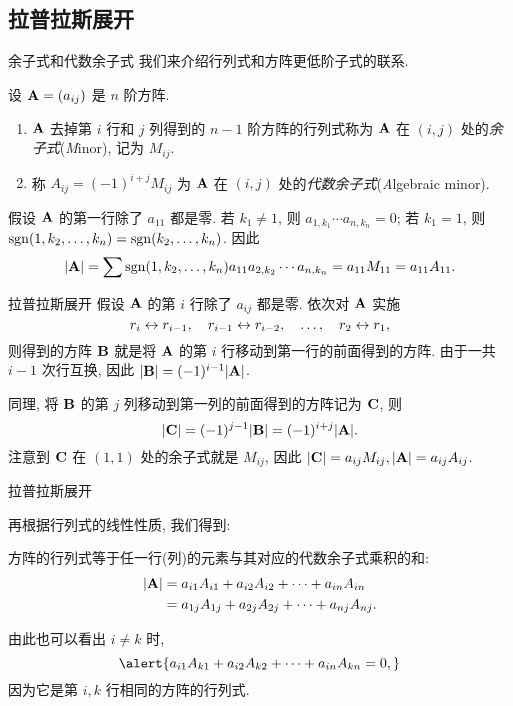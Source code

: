 \subsection{拉普拉斯展开}

\begin{frame}{余子式和代数余子式}
	\onslide<+->
	我们来介绍行列式和方阵更低阶子式的联系.
	\onslide<+->
	\begin{definition}
		设 ${\mathbf{A}}=(a_{ij})$ 是 $n$ 阶方阵.
		\begin{enumerate}
			\item ${\mathbf{A}}$ 去掉第 $i$ 行和 $j$ 列得到的 $n-1$ 阶方阵的行列式称为 ${\mathbf{A}}$ 在 $(i,j)$ 处的\emph{余子式}(\emph{M}inor), 记为 $M_{ij}$.
			\item 称 $A_{ij}=(-1)^{i+j}M_{ij}$ 为 ${\mathbf{A}}$ 在 $(i,j)$ 处的\emph{代数余子式}(\emph{A}lgebraic minor).
		\end{enumerate}
	\end{definition}
	\onslide<+->
	假设 ${\mathbf{A}}$ 的第一行除了 $a_{11}$ 都是零.
	\onslide<+->
	若 $k_1\neq 1$, 则 $a_{1,k_1}\cdots a_{n,k_n}=0$; 若 $k_1=1$, 则 $\operatorname{sgn}(1,k_2,\dots,k_n)=\operatorname{sgn}(k_2,\dots,k_n)$.
	\onslide<+->
	因此
	\[|{\mathbf{A}}|=\sum \operatorname{sgn}(1,k_2,\dots,k_n)a_{11}a_{2,k_2}\cdots a_{n,k_n}=a_{11} M_{11}=a_{11} A_{11}.\]
\end{frame}


\begin{frame}{拉普拉斯展开}
	\onslide<+->
	假设 ${\mathbf{A}}$ 的第 $i$ 行除了 $a_{ij}$ 都是零.
	\onslide<+->
	依次对 ${\mathbf{A}}$ 实施
	\[r_i\leftrightarrow r_{i-1},\quad r_{i-1}\leftrightarrow r_{i-2},\quad\dots,\quad r_2\leftrightarrow r_1,\]
	则得到的方阵 ${\mathbf{B}}$ 就是将 ${\mathbf{A}}$ 的第 $i$ 行移动到第一行的前面得到的方阵.
	\onslide<+->
	由于一共 $i-1$ 次行互换, 因此 $|{\mathbf{B}}|=(-1)^{i-1}|{\mathbf{A}}|$.

	\onslide<+->
	同理, 将 ${\mathbf{B}}$ 的第 $j$ 列移动到第一列的前面得到的方阵记为 ${\mathbf{C}}$, 则
	\[|{\mathbf{C}}|=(-1)^{j-1}|{\mathbf{B}}|=(-1)^{i+j}|{\mathbf{A}}|.\]
	\onslide<+->
	注意到 ${\mathbf{C}}$ 在 $(1,1)$ 处的余子式就是 $M_{ij}$, 因此 $|{\mathbf{C}}|=a_{ij}M_{ij}, |{\mathbf{A}}|=a_{ij}A_{ij}$.
\end{frame}


\begin{frame}{拉普拉斯展开}

	\onslide<+->
	再根据行列式的线性性质, 我们得到:
	\begin{theorem}
		方阵的行列式等于任一行(列)的元素与其对应的代数余子式乘积的和:
		\begin{align*}
			|{\mathbf{A}}|&=a_{i1}A_{i1}+a_{i2}A_{i2}+\cdots+a_{in}A_{in}\\
			&=a_{1j}A_{1j}+a_{2j}A_{2j}+\cdots+a_{nj}A_{nj}.
		\end{align*}
	\end{theorem}

	\onslide<+->
	由此也可以看出 \alert{$i\neq k$ 时,}
	\[\alert{a_{i1}A_{k1}+a_{i2}A_{k2}+\cdots+a_{in}A_{kn}=0,}\]
	\onslide<+->
	因为它是第 $i,k$ 行相同的方阵的行列式.
\end{frame}


